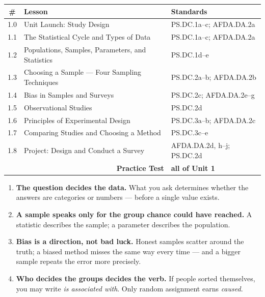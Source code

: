 \begin{tocbox}
\small
\renewcommand{\arraystretch}{1.22}
\begin{tabularx}{\linewidth}{@{} c X l @{}}
\rowcolor{frost}
\textbf{\#} & \textbf{Lesson} & \textbf{Standards} \\
\midrule
1.0 & Unit Launch: Study Design                        & PS.DC.1a--c; AFDA.DA.2a \\
1.1 & The Statistical Cycle and Types of Data          & PS.DC.1a--c; AFDA.DA.2a \\
1.2 & Populations, Samples, Parameters, and Statistics & PS.DC.1d--e \\
1.3 & Choosing a Sample --- Four Sampling Techniques   & PS.DC.2a--b; AFDA.DA.2b \\
1.4 & Bias in Samples and Surveys                      & PS.DC.2c; AFDA.DA.2e--g \\
1.5 & Observational Studies                            & PS.DC.2d \\
1.6 & Principles of Experimental Design                & PS.DC.3a--b; AFDA.DA.2c \\
1.7 & Comparing Studies and Choosing a Method          & PS.DC.3c--e \\
1.8 & Project: Design and Conduct a Survey             & AFDA.DA.2d, h--j; PS.DC.2d \\
\midrule
    & \multicolumn{1}{r}{\textbf{Practice Test}} & \textbf{all of Unit 1} \\
\end{tabularx}
\end{tocbox}

\vspace{0.12in}

\begin{spiralbox}
\small
\begin{enumerate}[leftmargin=1.6em, itemsep=3pt, topsep=2pt]
  \item \textbf{The question decides the data.} What you ask determines whether
        the answers are categories or numbers --- before a single value exists.
  \item \textbf{A sample speaks only for the group chance could have reached.}
        A statistic describes the sample; a parameter describes the population.
  \item \textbf{Bias is a direction, not bad luck.} Honest samples scatter
        around the truth; a biased method misses the same way every time --- and
        a bigger sample repeats the error more precisely.
  \item \textbf{Who decides the groups decides the verb.} If people sorted
        themselves, you may write \emph{is associated with}. Only random
        assignment earns \emph{caused}.
\end{enumerate}
\end{spiralbox}

